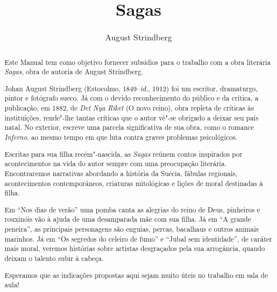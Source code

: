 \documentclass[12pt]{extarticle}
\begin{document}
\baselineskip\par


\newcommand{\AutorLivro}{August Strindberg}
\newcommand{\TituloLivro}{Sagas}
\newcommand{\Tema}{Ficção, mistério e fantasia}
\newcommand{\Genero}{Conto, crônica e novela}
\newcommand{\imagemCapa}{./images/PNLD0040-01.png}
\newcommand{\issnppub}{---}
\newcommand{\issnepub}{---}
\newcommand{\colaborador}{{Bruno Gradella e Vicente Castro}}


\title{\TituloLivro}
\author{\AutorLivro}
\def\authornotes{\colaborador}

\date{}
\maketitle

\begin{abstract}
Este Manual tem como objetivo fornecer subsídios para o trabalho com a
obra literária \emph{Sagas}, obra de autoria de August Strindberg.

Johan August Strindberg (Estocolmo, 1849--\textit{id.}, 1912) 
foi um escritor, dramaturgo, pintor e fotógrafo sueco. Já com o devido
reconhecimento do público e da crítica, a publicação, em 1882, de 
\textit{Det Nya Riket} (O novo reino), obra repleta de críticas às 
instituições, rende"-lhe tantas críticas que o autor vê"-se obrigado
a deixar seu país natal. No exterior, escreve uma parcela significativa 
de sua obra, como o romance \textit{Inferno}, ao mesmo tempo em que 
luta contra graves problemas psicológicos.

Escritas para sua filha recém"-nascida, as \textit{Sagas} reúnem contos
inspirados por acontecimentos na vida do autor sempre com uma preocupação 
literária. Encontraremos narrativas abordando a história da Suécia, fábulas 
regionais, acontecimentos contemporâneos, criaturas mitológicas e lições de 
moral destinadas à filha. 

Em ``Nos dias de verão'' uma pomba canta as alegrias do reino de Deus, 
pinheiros e rouxinóis vão à ajuda de uma desamparada mãe com sua filha. 
Já em ``A grande peneira'', as principais personagens são enguias, percas, 
bacalhaus e outros animais marinhos. Já em ``Os segredos do celeiro de fumo''
e ``Jubal sem identidade'', de caráter mais moral, veremos histórias sobre 
artistas desgraçados pela sua arrogância, quando deixam o talento subir à cabeça.

Esperamos que as indicações propostas aqui sejam muito úteis no trabalho em
sala de aula! 


\end{abstract}
\end{document}
